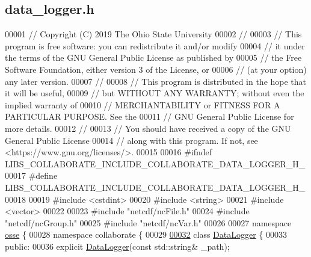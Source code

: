 \hypertarget{data__logger_8h_source}{}\subsection{data\+\_\+logger.\+h}
\label{data__logger_8h_source}

\begin{DoxyCode}
00001 \textcolor{comment}{// Copyright (C) 2019 The Ohio State University}
00002 \textcolor{comment}{//}
00003 \textcolor{comment}{// This program is free software: you can redistribute it and/or modify}
00004 \textcolor{comment}{// it under the terms of the GNU General Public License as published by}
00005 \textcolor{comment}{// the Free Software Foundation, either version 3 of the License, or}
00006 \textcolor{comment}{// (at your option) any later version.}
00007 \textcolor{comment}{//}
00008 \textcolor{comment}{// This program is distributed in the hope that it will be useful,}
00009 \textcolor{comment}{// but WITHOUT ANY WARRANTY; without even the implied warranty of}
00010 \textcolor{comment}{// MERCHANTABILITY or FITNESS FOR A PARTICULAR PURPOSE.  See the}
00011 \textcolor{comment}{// GNU General Public License for more details.}
00012 \textcolor{comment}{//}
00013 \textcolor{comment}{// You should have received a copy of the GNU General Public License}
00014 \textcolor{comment}{// along with this program.  If not, see <https://www.gnu.org/licenses/>.}
00015 
00016 \textcolor{preprocessor}{#ifndef LIBS\_COLLABORATE\_INCLUDE\_COLLABORATE\_DATA\_LOGGER\_H\_}
00017 \textcolor{preprocessor}{#define LIBS\_COLLABORATE\_INCLUDE\_COLLABORATE\_DATA\_LOGGER\_H\_}
00018 
00019 \textcolor{preprocessor}{#include <cstdint>}
00020 \textcolor{preprocessor}{#include <string>}
00021 \textcolor{preprocessor}{#include <vector>}
00022 
00023 \textcolor{preprocessor}{#include "netcdf/ncFile.h"}
00024 \textcolor{preprocessor}{#include "netcdf/ncGroup.h"}
00025 \textcolor{preprocessor}{#include "netcdf/ncVar.h"}
00026 
00027 \textcolor{keyword}{namespace }\hyperlink{namespaceosse}{osse} \{
00028 \textcolor{keyword}{namespace }collaborate \{
00029 
\hyperlink{classosse_1_1collaborate_1_1_data_logger}{00032} \textcolor{keyword}{class }\hyperlink{classosse_1_1collaborate_1_1_data_logger}{DataLogger} \{
00033  \textcolor{keyword}{public}:
00036   \textcolor{keyword}{explicit} \hyperlink{classosse_1_1collaborate_1_1_data_logger_a7f51038008c542dc5eb65575b30d9932}{DataLogger}(\textcolor{keyword}{const} std::string& \_path);

\end{DoxyCode}
